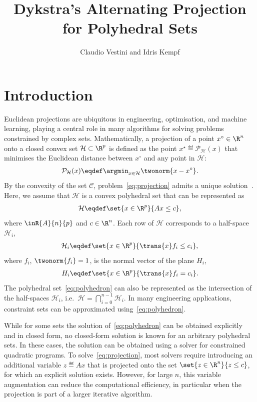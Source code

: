 \documentclass[hidelinks]{article}
\title{Dykstra's Alternating Projection for Polyhedral Sets}
\author{Claudio Vestini and Idris Kempf}
\begin{document}
\maketitle

\section{Introduction}

Euclidean projections are ubiquitous in engineering, optimisation, and machine learning, playing a central role in many algorithms for solving problems constrained by complex sets. Mathematically, a projection of a point $x^\circ\in\R^n$ onto a closed convex set $\mathcal{H}\subset \R^p$ is defined as the point $x^\star\eqdef \mathcal{P}_{\mathcal{H}}(x)$ that minimises the Euclidean distance between $x^\circ$ and any point in $\mathcal{H}$:
\begin{align}\label{eq:projection}
\mathcal{P}_{\mathcal{H}}(x)\eqdef \argmin_{x\in\mathcal{H}}\twonorm{x-x^\circ}.
\end{align}
By the convexity of the set $\mathcal{C}$, problem~\eqref{eq:projection} admits a unique solution~\cite[Ch.\ 3.2]{BAUSCHKEBOOK}. Here, we assume that $\mathcal{H}$ is a convex polyhedral set that can be represented as
\begin{align}\label{eq:polyhedron}
\mathcal{H}\eqdef\set{x\in\R^p}{A x \leq c},
\end{align}
where $\inR{A}{n}{p}$ and $c\in\R^n$. Each row of $\mathcal{H}$ corresponds to a half-space $\mathcal{H}_i$,
\begin{align}\label{eq:sets_i}
\mathcal{H}_i\eqdef\set{x\in\R^p}{\trans{x}f_i \leq c_i},
\end{align}
where $f_i$, $\twonorm{f_i}=1$, is the normal vector of the plane $H_i$,
\begin{align}\label{eq:sets_i2}
H_i\eqdef\set{x\in\R^p}{\trans{x}f_i = c_i}.
\end{align}
The polyhedral set~\eqref{eq:polyhedron} can also be represented as the intersection of the half-spaces $\mathcal{H}_i$, i.e.\ $\mathcal{H}=\bigcap_{i=0}^{n-1}\mathcal{H}_i$. In many engineering applications, constraint sets can be approximated using~\eqref{eq:polyhedron}.

While for some sets the solution of~\eqref{eq:polyhedron} can be obtained explicitly and in closed form, no closed-form solution is known for an arbitrary polyhedral sets. In these cases, the solution can be obtained using a solver for constrained quadratic programs. To solve~\eqref{eq:projection}, most solvers require introducing an additional variable $z\eqdef Ax$ that is projected onto the set $\set{z\in\R^n}{z \leq c}$, for which an explicit solution exists. However, for large $n$, this variable augmentation can reduce the computational efficiency, in particular when the projection is part of a larger iterative algorithm.
\end{document}
